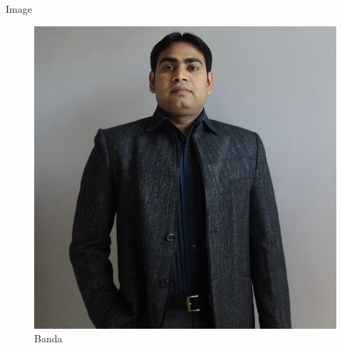 \documentclass[12pt]{article}
\begin{document}
	\huge Image 
	\begin{figure}[h]
		\includegraphics[width=0.8\textheight]{me.jpg}
		\caption{Banda}
		\label{fig:banda}
	\end{figure}
\end{document}
